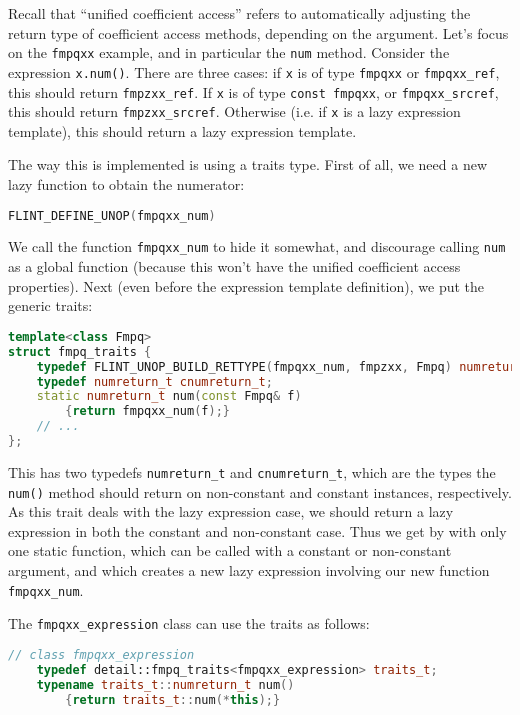 \documentclass[a4paper,10pt]{book}
\newcommand{\code}{\lstinline}
\begin{document}
{{Recall that ``unified coefficient access'' refers to automatically adjusting the
return type of coefficient access methods, depending on the argument. Let's
focus on the \code{fmpqxx} example, and in particular the \code{num} method.
Consider the expression \code{x.num()}. There are three cases: if \code{x} is of
type \code{fmpqxx} or \code{fmpqxx_ref}, this should return \code{fmpzxx_ref}.
If \code{x} is of type \code{const fmpqxx}, or \code{fmpqxx_srcref}, this should
return \code{fmpzxx_srcref}. Otherwise (i.e. if \code{x} is a lazy expression
template), this should return a lazy expression template.

The way this is implemented is using a traits type. First of all, we need a new
lazy function to obtain the numerator:

\begin{lstlisting}[language=c++]
FLINT_DEFINE_UNOP(fmpqxx_num)
\end{lstlisting}

We call the function \code{fmpqxx_num} to hide it somewhat, and discourage
calling \code{num} as a global function (because this won't have the unified
coefficient access properties). Next (even before the expression template
definition), we put the generic traits:

\begin{lstlisting}[language=c++]
template<class Fmpq>
struct fmpq_traits {
    typedef FLINT_UNOP_BUILD_RETTYPE(fmpqxx_num, fmpzxx, Fmpq) numreturn_t;
    typedef numreturn_t cnumreturn_t;
    static numreturn_t num(const Fmpq& f)
        {return fmpqxx_num(f);}
    // ...
};
\end{lstlisting}

This has two typedefs \code{numreturn_t} and \code{cnumreturn_t}, which are the
types the \code{num()} method should return on non-constant and constant
instances, respectively. As this trait deals with the lazy expression case, we
should return a lazy expression in both the constant and non-constant case. Thus
we get by with only one static function, which can be called with a constant or
non-constant argument, and which creates a new lazy expression involving our new
function \code{fmpqxx_num}.

The \code{fmpqxx_expression} class can use the traits as follows:

\begin{lstlisting}[language=c++]
// class fmpqxx_expression
    typedef detail::fmpq_traits<fmpqxx_expression> traits_t;
    typename traits_t::numreturn_t num()
        {return traits_t::num(*this);}
\end{lstlisting}

}}
\end{document}
